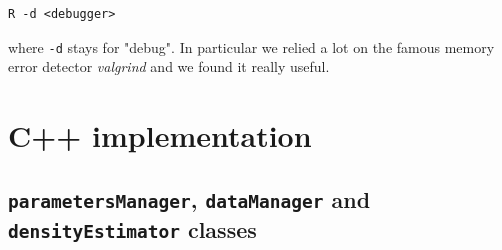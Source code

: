 \begin{lstlisting}
R -d <debugger>
\end{lstlisting}

where \verb|-d| stays for "debug". In particular we relied a lot on the famous memory error detector \emph{valgrind} and we found it really useful.

\section{C++ implementation} \label{c++}

\subsection{\texttt{parametersManager}, \texttt{dataManager} and \texttt{densityEstimator} classes}

